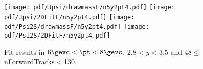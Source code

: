 \begin{figure}[H]
\begin{center}
\texttt{[image: pdf/Jpsi/drawmassF/n5y2pt4.pdf]}
\texttt{[image: pdf/Jpsi/2DFitF/n5y2pt4.pdf]}
\vspace*{-0.5cm}
\texttt{[image: pdf/Psi2S/drawmassF/n5y2pt4.pdf]}
\texttt{[image: pdf/Psi2S/2DFitF/n5y2pt4.pdf]}
\vspace*{-0.5cm}
\end{center}
\caption{Fit results in $6\gevc<\pt<8\gevc$, $2.8<y<3.5$ and 48$\leq$nForwardTracks$<$130.}
\label{Fitn5y2pt4}
\end{figure}
